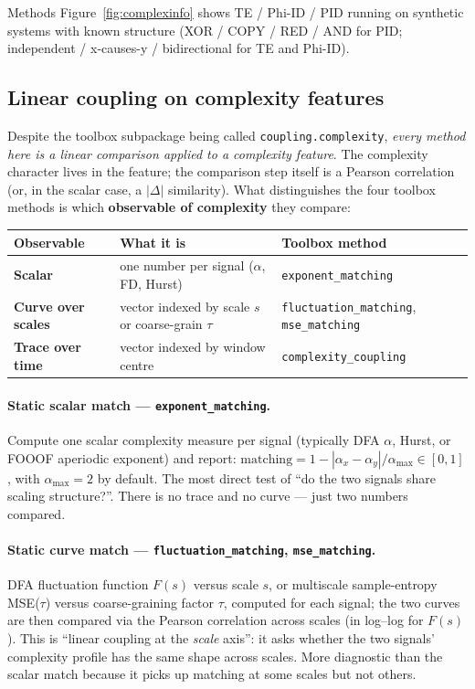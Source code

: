 \documentclass[11pt,a4paper]{article}
\begin{document}
Methods Figure~\ref{fig:complexinfo} shows TE / Phi-ID / PID running on
synthetic systems with known structure (XOR / COPY / RED / AND for PID;
independent / x-causes-y / bidirectional for TE and Phi-ID).

\subsection{Linear coupling on complexity features}
\label{sec:linear-complexity}

Despite the toolbox subpackage being called \texttt{coupling.complexity},
\emph{every method here is a linear comparison applied to a complexity
feature}. The complexity character lives in the feature; the comparison
step itself is a Pearson correlation (or, in the scalar case, a
$|\Delta|$ similarity). What distinguishes the four toolbox methods is
which \textbf{observable of complexity} they compare:

\begin{center}
\renewcommand{\arraystretch}{1.25}
\begin{tabular}{>{\bfseries}lll}
\toprule
Observable & What it is & Toolbox method \\
\midrule
Scalar      & one number per signal ($\alpha$, FD, Hurst)
            & \texttt{exponent\_matching} \\
Curve over scales & vector indexed by scale $s$ or coarse-grain $\tau$
            & \texttt{fluctuation\_matching}, \texttt{mse\_matching} \\
Trace over time   & vector indexed by window centre
            & \texttt{complexity\_coupling} \\
\bottomrule
\end{tabular}
\end{center}

\paragraph{Static scalar match --- \texttt{exponent\_matching}.}
Compute one scalar complexity measure per signal (typically DFA
$\alpha$, Hurst, or FOOOF aperiodic exponent) and report:
\(\mathrm{matching} = 1 - |\alpha_x - \alpha_y|/\alpha_{\max} \in [0,1]\),
with $\alpha_{\max}=2$ by default. The most direct test of ``do the two
signals share scaling structure?''. There is no trace and no curve ---
just two numbers compared.

\paragraph{Static curve match --- \texttt{fluctuation\_matching},
\texttt{mse\_matching}.}
DFA fluctuation function $F(s)$ versus scale $s$, or multiscale
sample-entropy MSE($\tau$) versus coarse-graining factor $\tau$,
computed for each signal; the two curves are then compared via the
Pearson correlation across scales (in log--log for $F(s)$). This is
``linear coupling at the \emph{scale} axis'': it asks whether the two
signals' complexity profile has the same shape across scales. More
diagnostic than the scalar match because it picks up matching at some
scales but not others.
\end{document}
